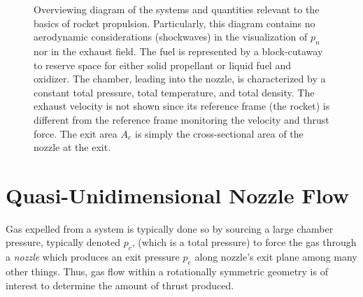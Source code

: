 \documentclass[11pt,dvipsnames]{thesis}
\begin{document}
\begin{figure}[H]
\caption{Overviewing diagram of the systems and quantities relevant to the basics of rocket propulsion. Particularly, this diagram contains no aerodynamic considerations (shockwaves) in the visualization of $p_n$ nor in the exhaust field. The fuel is represented by a block-cutaway to reserve space for either solid propellant or liquid fuel and oxidizer. The chamber, leading into the nozzle, is characterized by a constant total pressure, total temperature, and total density. The exhaust velocity is not shown since its reference frame (the rocket) is different from the reference frame monitoring the velocity and thrust force. The exit area $A_e$ is simply the cross-sectional area of the nozzle at the exit.}
\label{fig:PropFuelRocket}
\end{figure}

\section{Quasi-Unidimensional Nozzle Flow}
Gas expelled from a system is typically done so by sourcing a large chamber pressure, typically denoted $p_c$, (which is a total pressure) to force the gas through a \textit{nozzle} which produces an exit pressure $p_e$ along nozzle's exit plane among many other things. Thus, gas flow within a rotationally symmetric geometry is of interest to determine the amount of thrust produced.
\end{document}
